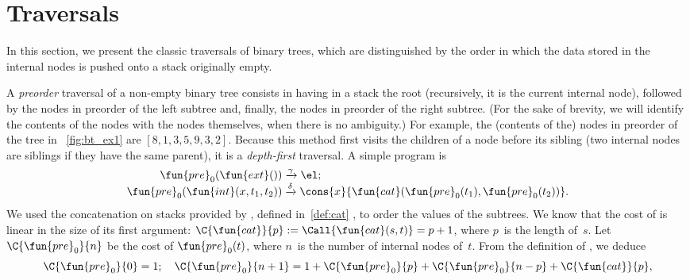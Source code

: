 \section{Traversals}
\label{sec:traversals}

In this section, we present the classic traversals of binary trees,
which are distinguished by the order in which the data stored in the
internal nodes is pushed onto a stack originally empty.

\label{preorder}

A \emph{preorder} traversal of a
non\hyp{}empty binary tree consists in having in a stack the root
(recursively, it is the current internal node), followed by the nodes
in preorder of the left subtree and, finally, the nodes in preorder of
the right subtree. (For the sake of brevity, we will identify the
contents of the nodes with the nodes themselves, when there is no
ambiguity.) For example, the (contents of the) nodes in preorder of
the tree in \fig~\vref{fig:bt_ex1} are \([8,1,3,5,9,3,2]\). Because
this method first visits the children of a node before its
sibling (two internal nodes are siblings if
they have the same parent), it is a
\emph{depth\hyp{}first}
traversal. A simple program is
\begin{align}
\fun{pre}_0(\fun{ext}()) &\xrightarrow{\smash{\gamma}} \el; \nonumber\\
\fun{pre}_0(\fun{int}(x,t_1,t_2)) &\xrightarrow{\smash{\delta}}
\cons{x}{\fun{cat}(\fun{pre}_0(t_1),\fun{pre}_0(t_2))}.
\label{eq:pre0}
\index{pre0@\fun{pre\(_0\)/1}}
\end{align}
We used the concatenation on stacks provided by
, defined in~\eqref{def:cat}
, to order the values of the subtrees. We know that
the cost of  is linear in the size of its first argument:
\(\C{\fun{cat}}{p} := \Call{\fun{cat}(s,t)} = p+1\), where \(p\)~is
the length of~\(s\). Let
\(\C{\fun{pre}_0}{n}\) be the cost of
\(\fun{pre}_0(t)\), where \(n\)~is the number of internal nodes
of~\(t\). From the definition of , we deduce
\begin{equation*}
\C{\fun{pre}_0}{0} = 1;\quad
\C{\fun{pre}_0}{n+1} =
  1 + \C{\fun{pre}_0}{p} + \C{\fun{pre}_0}{n-p} + \C{\fun{cat}}{p},
\index{pre0@$\C{\fun{pre}_0}{n}$}
\end{equation*}
